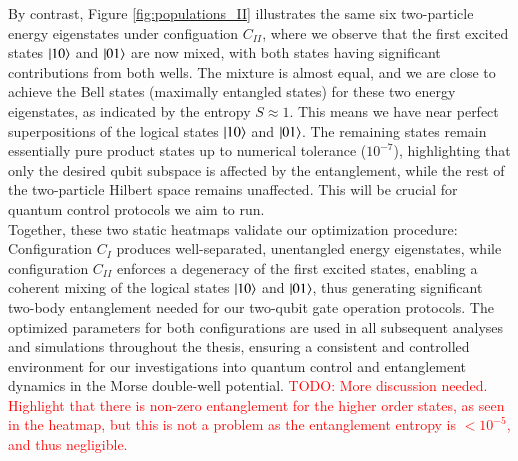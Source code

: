 \documentclass{subfiles}
\begin{document}
By contrast, Figure \ref{fig:populations_II} illustrates the same six two-particle energy eigenstates under configuation $C_{II}$, where we observe that the first excited states $\ket{10}$ and $\ket{01}$ are now mixed, with both states having significant contributions from both wells. The mixture is almost equal, and we are close to achieve the Bell states (maximally entangled states) for these two energy eigenstates, as indicated by the entropy $S \approx 1$. This means we have near perfect superpositions of the logical states $\ket{10}$ and $\ket{01}$. The remaining states remain essentially pure product states up to numerical tolerance ($10^{-7}$), highlighting that only the desired qubit subspace is affected by the entanglement, while the rest of the two-particle Hilbert space remains unaffected. This will be crucial for quantum control protocols we aim to run.
\\

Together, these two static heatmaps validate our optimization procedure: Configuration $C_I$ produces well-separated, unentangled energy eigenstates, while configuration $C_{II}$ enforces a degeneracy of the first excited states, enabling a coherent mixing of the logical states $\ket{10}$ and $\ket{01}$, thus generating significant two-body entanglement needed for our two-qubit gate operation protocols. The optimized parameters for both configurations are used in all subsequent analyses and simulations throughout the thesis, ensuring a consistent and controlled environment for our investigations into quantum control and entanglement dynamics in the Morse double-well potential. \textcolor{red}{TODO: More discussion needed. Highlight that there is non-zero entanglement for the higher order states, as seen in the heatmap, but this is not a problem as the entanglement entropy is $< 10^{-5}$, and thus negligible. }
\end{document}
